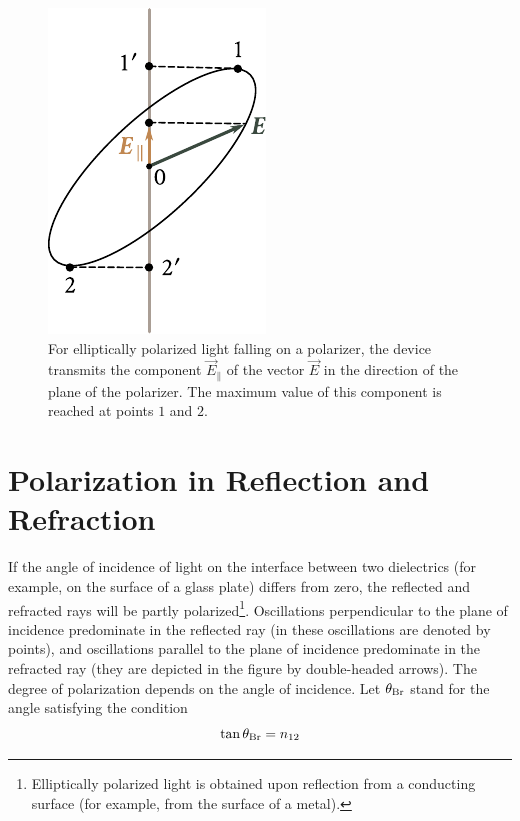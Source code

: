 \begin{figure}[t]
	\begin{center}
		\includegraphics[scale=0.9]{figures/ch_19/fig_19_5.pdf}
        \caption[]{For elliptically polarized light falling on a polarizer, the device transmits the component $\vec{E}_{\parallel}$ of the vector $\vec{E}$ in the direction of the plane of the polarizer. The maximum value of this component is reached at points $1$ and $2$.}
		\label{fig:19_5}
	\end{center}
	\vspace{-0.8cm}
\end{figure}

\section{Polarization in Reflection and Refraction}\label{sec:19_2}

If the angle of incidence of light on the interface between two dielectrics (for example, on the surface of a glass plate) differs from
zero, the reflected and refracted rays will be partly polarized\footnote{Elliptically polarized light is obtained upon reflection from a conducting surface (for example, from the surface of a metal).}.
Oscillations perpendicular to the plane of incidence predominate in the reflected ray (in  these oscillations are denoted by points), and oscillations parallel to the plane of incidence predominate in the refracted ray (they are depicted in the figure by double-headed arrows).
The degree of polarization depends on the
angle of incidence.
Let $\theta_{\text{Br}}$ stand for the angle satisfying the condition
\vspace{-12pt}
\begin{equation}\label{eq:19_6}
	\tan\theta_{\text{Br}} = n_{12}
\end{equation}

